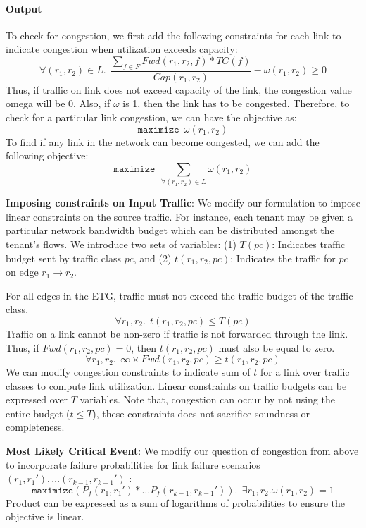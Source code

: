 \documentclass[]{article}
\begin{document}
\noindent\paragraph{Output} 
To check for congestion, we first add the following constraints for 
each link to indicate congestion when utilization exceeds capacity: 
\begin{equation}
\forall (r_1, r_2) \in L. ~~\frac{\sum_{f \in F} Fwd(r_1, r_2, f) * TC(f)}{Cap(r_1, r_2)} - \omega(r_1, r_2) \geq 0
\end{equation}
Thus, if traffic on link does not exceed capacity of the link, the congestion value
omega will be 0. Also, if $\omega$ is 1, then the link has to be congested. Therefore,
to check for a particular link congestion, we can have the objective as:
\[
\texttt{maximize} ~~\omega(r_1, r_2)
\]	
To find if any link in the network can become congested, we can add the following
objective:
\[
\texttt{maximize} ~~\sum_{\forall (r_1,r_2) \in L} \omega(r_1, r_2)
\]

\textbf{Imposing constraints on Input Traffic}: We modify our formulation to
impose linear constraints on the source traffic. For instance, each tenant may be
given a particular network bandwidth budget which can be distributed amongst the 
tenant's flows. 
We introduce two sets of variables: (1) $T(pc)$: Indicates traffic budget sent by traffic 
class $pc$, and (2) $t(r_1, r_2, pc)$: Indicates the traffic for $pc$ on edge 
$r_1 \rightarrow r_2$.

For all edges in the ETG, traffic must not exceed the traffic budget of the traffic class.
\begin{equation*}
	\forall r_1, r_2. ~~t(r_1, r_2, pc) \leq T(pc)
\end{equation*}
Traffic on a link cannot be non-zero if traffic is not forwarded through the link. Thus, 
if $Fwd(r_1,r_2,pc)=0$, then $t(r_1, r_2, pc)$ must also be equal to zero.
\begin{equation*}
	\forall r_1, r_2. ~~\infty \times Fwd(r_1, r_2, pc) \geq t(r_1, r_2, pc)
\end{equation*}
We can modify congestion constraints to indicate sum of $t$ for a link over traffic classes
to compute link utilization. Linear constraints on traffic budgets can be expressed over 
$T$ variables. Note that, congestion can occur by not using the entire budget ($t \leq T$), 
these constraints does not sacrifice soundness or completeness. 	


\textbf{Most Likely Critical Event}: We modify our question of congestion from above to
incorporate failure probabilities for link failure scenarios $(r_1, r_1'),\ldots(r_{k-1}, r_{k-1}')$ : 
\[
\texttt{maximize} (P_f(r_1,r_1') *\ldots P_f(r_{k-1}, r_{k-1}')). 
~~\exists r_1, r_2. \omega(r_1, r_2) = 1
\]
Product can be expressed as a sum of logarithms of probabilities to ensure the objective is linear. 

%

 
\begin{small}
	
\end{small}
\end{document}
